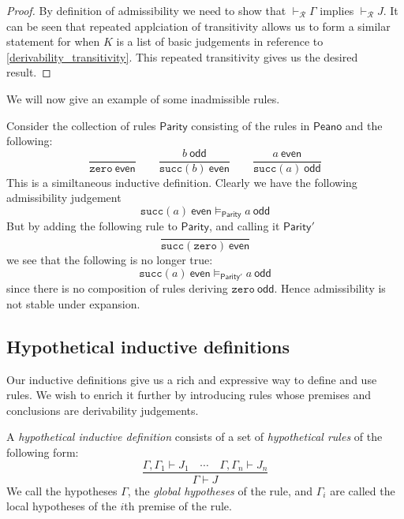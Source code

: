 \begin{proof}
    By definition of admissibility we need to show that $\vdash_{\mathcal{R}} \Gamma$ implies $\vdash_{\mathcal{R}} J$. It can be seen that repeated applciation of transitivity allows us to form a similar statement for when $K$ is a list of basic judgements in reference to \ref{derivability_transitivity}. This repeated transitivity gives us the desired result.
\end{proof}

We will now give an example of some inadmissible rules.

\begin{example}
    Consider the collection of rules $\mathsf{Parity}$ consisting of the rules in $\mathsf{Peano}$ and the following:
    $$
        \frac{}{\texttt{zero}\ \mathsf{even}} \qquad
        \frac{b\ \mathsf{odd}}{\texttt{succ}(b)\ \mathsf{even}} \qquad
        \frac{a\ \mathsf{even}}{\texttt{succ}(a)\ \mathsf{odd}}
    $$
    This is a similtaneous inductive definition. Clearly we have the following admissibility judgement
    $$ \texttt{succ}(a)\ \mathsf{even} \vDash_{\mathsf{Parity}} a\ \mathsf{odd} $$
    But by adding the following rule to $\mathsf{Parity}$, and calling it $\mathsf{Parity}'$
    $$
        \frac{}{\texttt{succ}(\texttt{zero}) \ \mathsf{even}}
    $$
    we see that the following is no longer true:
    $$ \texttt{succ}(a)\ \mathsf{even} \vDash_{\mathsf{Parity'}} a\ \mathsf{odd} $$
    since there is no composition of rules deriving $\texttt{zero}\ \mathsf{odd}$.
    Hence admissibility is not stable under expansion.
\end{example}


\subsection{Hypothetical inductive definitions}

Our inductive definitions give us a rich and expressive way to define and use rules. We wish to enrich it further by introducing rules whose premises and conclusions are derivability judgements.

\begin{defin}
    A \emph{hypothetical inductive definition} consists of a set of \emph{hypothetical rules} of the following form:
    $$
        \frac{\Gamma, \Gamma_1 \vdash J_1 \quad \cdots \quad \Gamma, \Gamma_n \vdash J_n}{\Gamma \vdash J}
    $$
    We call the hypotheses $\Gamma$, the \emph{global hypotheses} of the rule, and $\Gamma_i$ are called the local hypotheses of the $i$th premise of the rule.
\end{defin}

